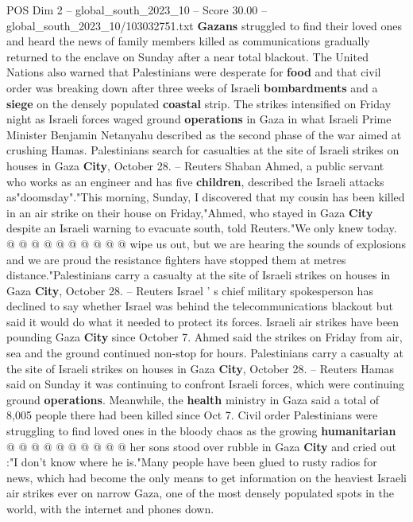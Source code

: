 \begin{textsample}{POS Dim 2 – global\_south\_2023\_10 – Score 30.00 – global\_south\_2023\_10/103032751.txt}  \label{ex:f2_pos_174}
\textbf{Gazans} struggled to find their loved ones and heard the news of family members killed as communications gradually returned to the enclave on Sunday after a near total blackout.
The United Nations also warned that Palestinians were desperate for \textbf{food} and that civil order was breaking down after three weeks of Israeli \textbf{bombardments} and a \textbf{siege} on the densely populated \textbf{coastal} strip.
The strikes intensified on Friday night as Israeli forces waged ground \textbf{operations} in Gaza in what Israeli Prime Minister Benjamin Netanyahu described as the second phase of the war aimed at crushing Hamas.
Palestinians search for casualties at the site of Israeli strikes on houses in Gaza \textbf{City}, October 28. -- Reuters Shaban Ahmed, a public servant who works as an engineer and has five \textbf{children}, described the Israeli attacks as"doomsday"."This morning, Sunday, I discovered that my cousin has been killed in an air strike on their house on Friday,"Ahmed, who stayed in Gaza \textbf{City} despite an Israeli warning to evacuate south, told Reuters."We only knew today. @ @ @ @ @ @ @ @ @ @ wipe us out, but we are hearing the sounds of explosions and we are proud the resistance fighters have stopped them at metres distance."Palestinians carry a casualty at the site of Israeli strikes on houses in Gaza \textbf{City}, October 28. -- Reuters Israel ' s chief military spokesperson has declined to say whether Israel was behind the telecommunications blackout but said it would do what it needed to protect its forces.
Israeli air strikes have been pounding Gaza \textbf{City} since October 7.
Ahmed said the strikes on Friday from air, sea and the ground continued non-stop for hours.
Palestinians carry a casualty at the site of Israeli strikes on houses in Gaza \textbf{City}, October 28. -- Reuters Hamas said on Sunday it was continuing to confront Israeli forces, which were continuing ground \textbf{operations}.
Meanwhile, the \textbf{health} ministry in Gaza said a total of 8,005 people there had been killed since Oct 7.
Civil order Palestinians were struggling to find loved ones in the bloody chaos as the growing \textbf{humanitarian} @ @ @ @ @ @ @ @ @ @ her sons stood over rubble in Gaza \textbf{City} and cried out :"I don't know where he is."Many people have been glued to rusty radios for news, which had become the only means to get information on the heaviest Israeli air strikes ever on narrow Gaza, one of the most densely populated spots in the world, with the internet and phones down.

\end{textsample}
